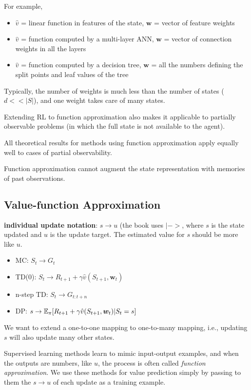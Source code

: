 \documentclass[sutton_barto_notes.tex]{subfiles}
\begin{document}
For example,
\begin{itemize}
\item $\hat{v}$ = linear function in features of the state, $\bm{w}$ = vector of feature weights
\item $\hat{v}$ = function computed by a multi-layer ANN, $\bm{w}$ = vector of connection weights in all the layers
\item $\hat{v}$ = function computed by a decision tree, $\bm{w}$ = all the numbers defining the split points and leaf values of the tree
\end{itemize}

Typically, the number of weights is much less than the number of states ($d <<|S|$), and one weight takes care of many states.

Extending RL to function approximation also makes it applicable to partially observable problems (in which the full state is not available to the agent).

All theoretical results for methods using function approximation apply equally well to cases of partial observability.

Function approximation cannot augment the state representation with memories of past observations.

\subsection{Value-function Approximation}

\begin{definition}
\textbf{individual update notation}: $s \rightarrow u$ (the book uses $|->$, where $s$ is the state updated and $u$ is the update target. The estimated value for $s$ should be more like $u$.
\end{definition}

\begin{itemize}
\item MC: $S_t \rightarrow G_t$
\item TD(0): $S_t \rightarrow R_{t+1} + \gamma \hat{v}(S_{t+1},\bm{w}_t)$
\item n-step TD: $S_t \rightarrow G_{t:t+n}$
\item DP: $s \rightarrow \operatorname*{\mathbb{E}}_\pi [R_{t+1} + \gamma \hat{v}(S_{t+1}, \bm{w}_t) | S_t = s]$
\end{itemize}

We want to extend a one-to-one mapping to one-to-many mapping, i.e., updating $s$ will also update many other states.

Supervised learning methods learn to mimic input-output examples, and when the outputs are numbers, like $u$, the process is often called \textit{function approximation}.
We use these methods for value prediction simply by passing to them the $s \rightarrow u$ of each update as a training example.
\end{document}
